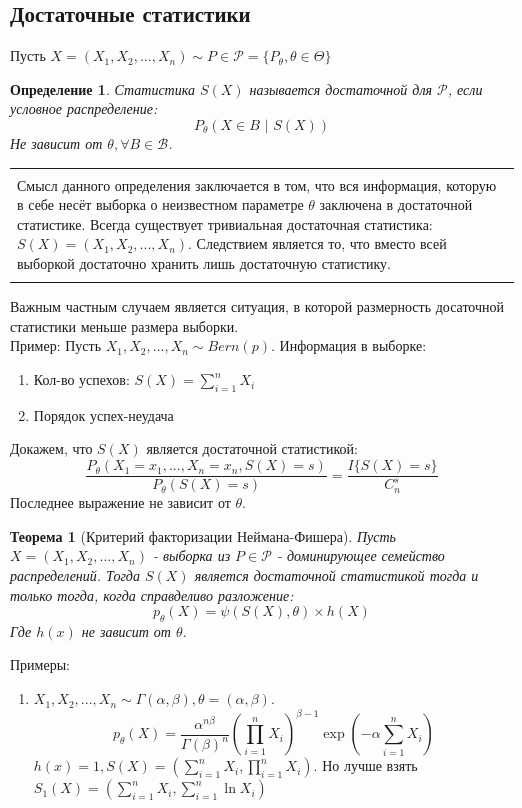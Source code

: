 \documentclass[a4paper,12pt]{article}
\newcommand{\sumin}{\sum\limits_{i=1}^n}
\newcommand{\prodin}{\prod\limits_{i=1}^n}
\newcommand{\sample}{X_1, X_2, ..., X_n}
\newenvironment{annotation}{\begin{center}
    \begin{tabular}{|p{0.9\textwidth}|}
    \hline\\
}
{ 
    \\\\\hline
    \end{tabular} 
    \end{center}
}
\newtheorem{dfn}{Определение}[section]
\theoremstyle{named}
\newtheorem*{namedtheorem}{Теорема}
\begin{document}
\subsection{Достаточные статистики}
Пусть $X = (\sample) \sim P \in \mathcal{P} = \{ P_\theta, \theta \in \Theta\}$
\begin{dfn}
    Статистика $S(X)$ называется достаточной для $\mathcal{P}$, если условное распределение:
    $$
        P_\theta(X \in B \,\, | \,\, S(X))
    $$
    Не зависит от $\theta, \forall B\in \mathcal{B}$. 
\end{dfn}
\begin{annotation}
    Смысл данного определения заключается в том, что вся информация, которую в себе несёт выборка о неизвестном параметре $\theta$ заключена 
    в достаточной статистике. Всегда существует тривиальная достаточная статистика: $S(X) = (\sample)$. Следствием является то, что 
    вместо всей выборкой достаточно хранить лишь достаточную статистику. 
\end{annotation}
Важным частным случаем является ситуация, в которой размерность досаточной статистики меньше размера выборки. \\ 
Пример: Пусть $\sample \sim Bern(p)$. Информация в выборке:
\begin{enumerate}
    \item Кол-во успехов: $S(X) = \sumin X_i$
    \item Порядок успех-неудача
\end{enumerate}
Докажем, что $S(X)$ является достаточной статистикой:
$$
    \frac{P_\theta(X_1 = x_1, ..., X_n = x_n, S(X) = s)}{P_\theta(S(X) = s)} = \frac{I\{S(X) = s \}}{C_n^s}
$$
Последнее выражение не зависит от $\theta$. 
\begin{namedtheorem}[Критерий факторизации Неймана-Фишера]
    Пусть $X = (\sample)$ - выборка из $P \in \mathcal{P}$ - доминирующее семейство распределений. Тогда $S(X)$ является 
    достаточной статистикой тогда и только тогда, когда справделиво разложение:
    $$
        p_\theta(X) = \psi(S(X), \theta)\times h(X)
    $$
    Где $h(x)$ не зависит от $\theta$. 
\end{namedtheorem}
Примеры: 
\begin{enumerate}
    \item $\sample \sim \Gamma(\alpha, \beta), \theta = (\alpha, \beta)$.
    $$
        p_\theta(X) = \frac{\alpha^{n\beta}}{\Gamma(\beta)^n}\left(\prodin X_i\right)^{\beta - 1}\exp(-\alpha\sumin X_i)
    $$
    $h(x) = 1, S(X) = \left(\sumin X_i, \prodin X_i\right)$. Но лучше взять $S_1(X)= \left(\sumin X_i, \sumin \ln X_i\right)$
\end{enumerate}
\end{document}
